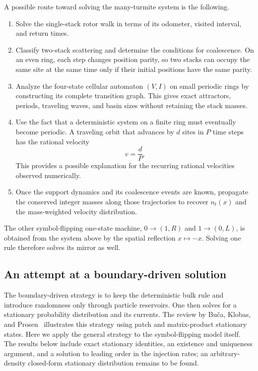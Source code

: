 \documentclass{article}
\begin{document}
A possible route toward solving the many-turmite system is the following.
\begin{enumerate}
    \item Solve the single-stack rotor walk in terms of its odometer, visited
    interval, and return times.

    \item Classify two-stack scattering and determine the conditions for
    coalescence.  On an even ring, each step changes position parity, so two
    stacks can occupy the same site at the same time only if their initial
    positions have the same parity.

    \item Analyze the four-state cellular automaton $(V,I)$ on small periodic
    rings by constructing its complete transition graph.  This gives exact
    attractors, periods, traveling waves, and basin sizes without retaining
    the stack masses.

    \item Use the fact that a deterministic system on a finite ring must
    eventually become periodic.  A traveling orbit that advances by $d$
    sites in $P$ time steps has the rational velocity
    \begin{equation}
    v=\frac{d}{P}.
    \end{equation}
    This provides a possible explanation for the recurring rational
    velocities observed numerically.

    \item Once the support dynamics and its coalescence events are known,
    propagate the conserved integer masses along those trajectories to
    recover $n_t(x)$ and the mass-weighted velocity distribution.
\end{enumerate}

The other symbol-flipping one-state machine,
$0\longrightarrow(1,R)$ and $1\longrightarrow(0,L)$, is obtained from the
system above by the spatial reflection $x\mapsto -x$.  Solving one rule
therefore solves its mirror as well.

\subsection{An attempt at a boundary-driven solution}
\label{sec:boundary-driven}

The boundary-driven strategy is to keep the deterministic bulk rule and
introduce randomness only through particle reservoirs.  One then solves for
a stationary probability distribution and its currents.  The review by
Bu\v{c}a, Klobas, and Prosen~\citep{buca2021rule54} illustrates this
strategy using patch and matrix-product stationary states.  Here we apply
the general strategy to the symbol-flipping model itself.  The results below
include exact stationary identities, an existence and uniqueness argument,
and a solution to leading order in the injection rates; an arbitrary-density
closed-form stationary distribution remains to be found.
\end{document}
